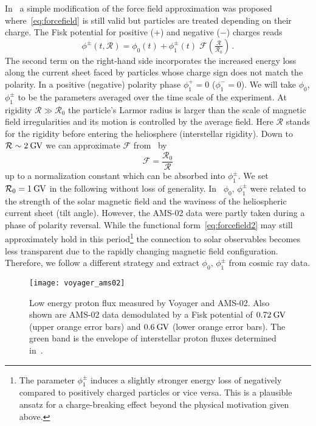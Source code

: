 \documentclass[a4paper,11pt]{article}
\newcommand{\eVdist}{\kern-0.06em}
\newcommand{\gv}{\:\text{G\eVdist V}}
\begin{document}
In~\cite{Cholis:2015gna} a simple modification of the force field approximation was proposed where~\eqref{eq:forcefield} is still valid but particles are treated depending on their charge. The Fisk potential for positive ($+$) and negative ($-$) charges reads 
\begin{equation}\label{eq:forcefield2}
 \phi^{\pm}(t,\mathcal{R})= \phi_0(t) + \phi_1^{\pm}(t) \;\mathcal{F}\!\left(\tfrac{\mathcal{R}}{\mathcal{R}_0}\right)\,.
\end{equation}
The second term on the right-hand side incorporates the increased energy loss along the current sheet faced by particles whose charge sign does not match the polarity. In a positive (negative) polarity phase $\phi_1^+=0$ ($\phi_1^-=0$). We will take $\phi_0$, $\phi_1^{\pm}$ to be the parameters averaged over the time scale of the experiment.
At rigidity $\mathcal{R}\gg\mathcal{R}_0$ the particle's Larmor radius is larger than the scale of magnetic field irregularities and its motion is controlled by the average field. Here $\mathcal{R}$ stands for the rigidity before entering the heliosphere (interstellar rigidity). Down to $\mathcal{R}\sim 2\gv$ we can approximate $\mathcal{F}$ from~\cite{Cholis:2015gna} by  
\begin{equation}\label{eq:faprox}
 \mathcal{F}= \frac{\mathcal{R}_0}{\mathcal{R}}
\end{equation}
up to a normalization constant which can be absorbed into $\phi_1^{\pm}$. We set $\mathcal{R}_0=1\gv$ in the following without loss of generality. In~\cite{Cholis:2015gna} $\phi_{0},\,\phi_1^{\pm}$ were related to the strength of the solar magnetic field and the waviness of the heliospheric current sheet (tilt angle). However, the AMS-02 data were partly taken during a phase of polarity reversal. While the functional form~\eqref{eq:forcefield2} may still approximately hold in this period\footnote{The parameter $\phi_1^{\pm}$ induces a slightly stronger energy loss of negatively compared to positively charged particles or vice versa. This is a plausible ansatz for a charge-breaking effect beyond the physical motivation given above.} the connection to solar observables becomes less transparent due to the rapidly changing magnetic field configuration. Therefore, we follow a different strategy and extract $\phi_{0},\,\phi_1^{\pm}$ from cosmic ray data.


\begin{figure}[htp]
\begin{center}
  \texttt{[image: voyager\_ams02]}
\end{center}
\caption{Low energy proton flux measured by Voyager and AMS-02. Also shown are AMS-02 data demodulated by a Fisk potential of $0.72\gv$ (upper orange error bars) and $0.6\gv$ (lower orange error bars). The green band is the envelope of interstellar proton fluxes determined in~\cite{Vos:2015,Ghelfi:2015tvu,Corti:2015bqi}.}
\label{fig:voyager}
\end{figure}
\end{document}
